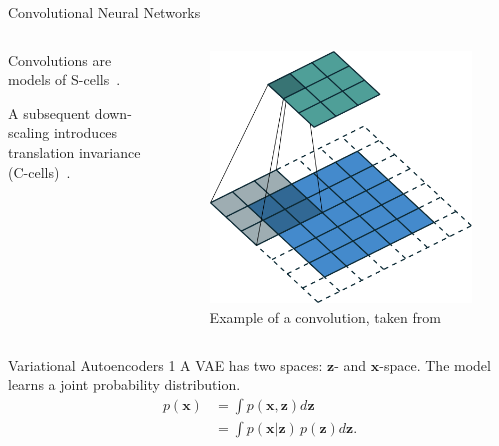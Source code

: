\documentclass{beamer}
\begin{document}
\begin{frame}{Convolutional Neural Networks}
\begin{columns}
\begin{column}{0.48\textwidth}
Convolutions are models of S-cells~\cite{lindsay2020convolutional}.

A subsequent down-scaling introduces translation invariance (C-cells)~\cite{lindsay2020convolutional}.
\end{column}
\begin{column}{0.48\textwidth}
\begin{figure}
\centering
\includegraphics[width=\textwidth]{pres_imgs/convolution_example.png}
\caption{Example of a convolution, taken from \cite{dumoulin2016guide}}
\label{fig:example_convolution}
\end{figure}
\end{column}
\end{columns}
\end{frame}
\begin{frame}{Variational Autoencoders 1}
A VAE has two spaces: $\bm{z}$- and $\bm{x}$-space.
The model learns a joint probability distribution.
\begin{align*}
p(\bm{x}) &= \int p(\bm{x}, \bm{z})d\bm{z}\\
&= \int p(\bm{x}|\bm{z})\,p(\bm{z})d\bm{z}.
\end{align*}
\end{frame}
\end{document}
